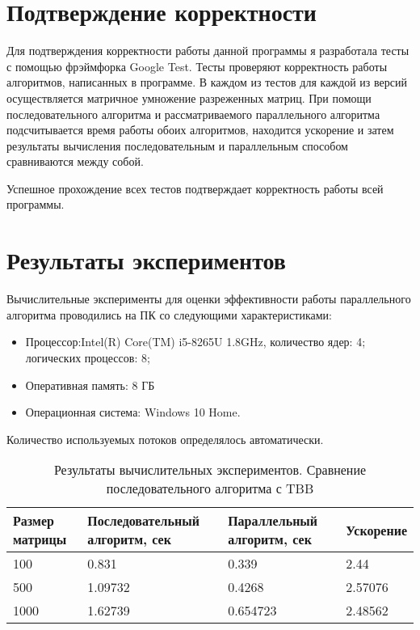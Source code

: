 \documentclass{report}
\begin{document}
\section*{Подтверждение корректности}
Для подтверждения корректности работы данной программы я разработала тесты с помощью фрэймфорка Google Test. Тесты проверяют корректность работы алгоритмов, написанных в программе. В каждом из тестов для каждой из версий осуществляется матричное умножение разреженных матриц. При помощи последовательного алгоритма и рассматриваемого параллельного алгоритма подсчитывается время работы обоих алгоритмов, находится ускорение и затем результаты вычисления  последовательным и параллельным способом сравниваются между собой.
\par Успешное прохождение всех тестов подтверждает корректность работы всей программы.
\newpage

\section*{Результаты экспериментов}
Вычислительные эксперименты для оценки эффективности работы параллельного алгоритма проводились на ПК со следующими характеристиками:
\begin{itemize}
\item Процессор:Intel(R) Core(TM) i5-8265U 1.8GHz, количество ядер: 4; логических процессов: 8;
\item Оперативная память: 8 ГБ
\item Операционная система: Windows 10 Home.
\end{itemize}
\par Количество используемых потоков определялось автоматически.
\begin{table}[!h]
\caption{Результаты вычислительных экспериментов. Сравнение последовательного алгоритма с TBB}
\centering
\begin{tabular}{|p{4cm}|p{4cm}|p{4cm}|p{3cm}|}
\hline
Размер матрицы & Последовательный алгоритм, сек & Параллельный алгоритм, сек & Ускорение  \\\hline
100 & 0.831 & 0.339 & 2.44  \\\hline
500  & 1.09732 & 0.4268 & 2.57076  \\\hline
1000 & 1.62739 & 0.654723 & 2.48562  \\
\hline
\end{tabular}
\end{table}
\end{document}
